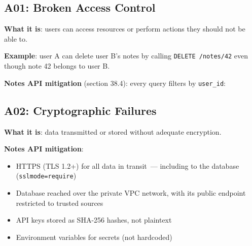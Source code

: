 \subsection*{A01: Broken Access Control}\label{38-security:a01-broken-access-control}

\textbf{What it is}: users can access resources or perform actions they should not be able to.

\textbf{Example}: user A can delete user B's notes by calling \texttt{DELETE\ /notes/42} even though note 42 belongs to user B.

\textbf{Notes API mitigation} (section 38.4): every query filters by \texttt{user\_id}:

\begin{codebox}[short]

\begin{Shaded}
\begin{Highlighting}[]
\NormalTok{),}
\NormalTok{    (note\_id, g.current\_user[}\NormalTok{]),}
\NormalTok{)}
\end{Highlighting}
\end{Shaded}

\end{codebox}

\subsection*{A02: Cryptographic Failures}\label{38-security:a02-cryptographic-failures}

\textbf{What it is}: data transmitted or stored without adequate encryption.

\textbf{Notes API mitigation}:

\begin{itemize}
\tightlist
\item
  HTTPS (TLS 1.2+) for all data in transit~--- including to the database (\texttt{sslmode=require})
\item
  Database reached over the private VPC network, with its public endpoint restricted to trusted sources
\item
  API keys stored as SHA-256 hashes, not plaintext
\item
  Environment variables for secrets (not hardcoded)
\end{itemize}

